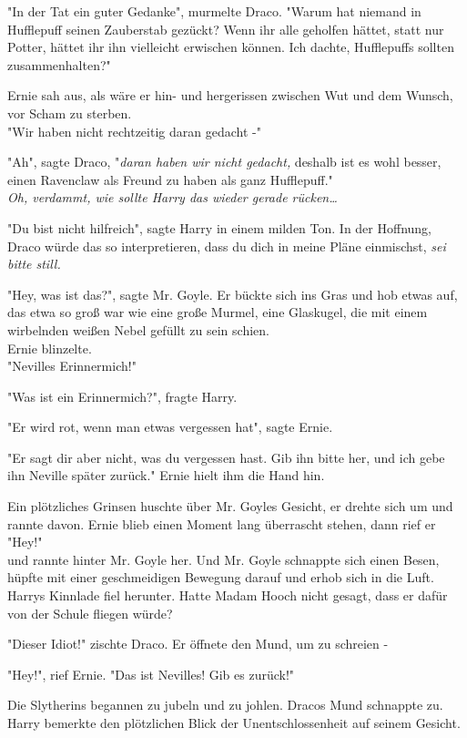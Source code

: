 {"In der Tat ein guter Gedanke", murmelte Draco. "Warum hat niemand in Hufflepuff seinen Zauberstab gezückt? Wenn ihr alle geholfen hättet, statt nur Potter, hättet ihr ihn vielleicht erwischen können. Ich dachte, Hufflepuffs sollten zusammenhalten?"

Ernie sah aus, als wäre er hin- und hergerissen zwischen Wut und dem Wunsch, vor Scham zu sterben.\\ "Wir haben nicht rechtzeitig daran gedacht -"

"Ah", sagte Draco, "\emph{daran haben wir nicht gedacht,} deshalb ist es wohl besser, einen Ravenclaw als Freund zu haben als ganz Hufflepuff."\\ \emph{Oh, verdammt, wie sollte Harry das wieder gerade rücken…}

"Du bist nicht hilfreich", sagte Harry in einem milden Ton. In der Hoffnung, Draco würde das so interpretieren, dass du dich in meine Pläne einmischst, \emph{sei bitte still.}

"Hey, was ist das?", sagte Mr. Goyle. Er bückte sich ins Gras und hob etwas auf, das etwa so groß war wie eine große Murmel, eine Glaskugel, die mit einem wirbelnden weißen Nebel gefüllt zu sein schien.\\ Ernie blinzelte.\\ "Nevilles Erinnermich!"

"Was ist ein Erinnermich?", fragte Harry.

"Er wird rot, wenn man etwas vergessen hat", sagte Ernie.

"Er sagt dir aber nicht, was du vergessen hast. Gib ihn bitte her, und ich gebe ihn Neville später zurück." Ernie hielt ihm die Hand hin.

Ein plötzliches Grinsen huschte über Mr. Goyles Gesicht, er drehte sich um und rannte davon. Ernie blieb einen Moment lang überrascht stehen, dann rief er\\ "Hey!"\\ und rannte hinter Mr. Goyle her. Und Mr. Goyle schnappte sich einen Besen, hüpfte mit einer geschmeidigen Bewegung darauf und erhob sich in die Luft.\\ Harrys Kinnlade fiel herunter. Hatte Madam Hooch nicht gesagt, dass er dafür von der Schule fliegen würde?

"Dieser Idiot!" zischte Draco. Er öffnete den Mund, um zu schreien -

"Hey!", rief Ernie. "Das ist Nevilles! Gib es zurück!"

Die Slytherins begannen zu jubeln und zu johlen. Dracos Mund schnappte zu. Harry bemerkte den plötzlichen Blick der Unentschlossenheit auf seinem Gesicht.

}
